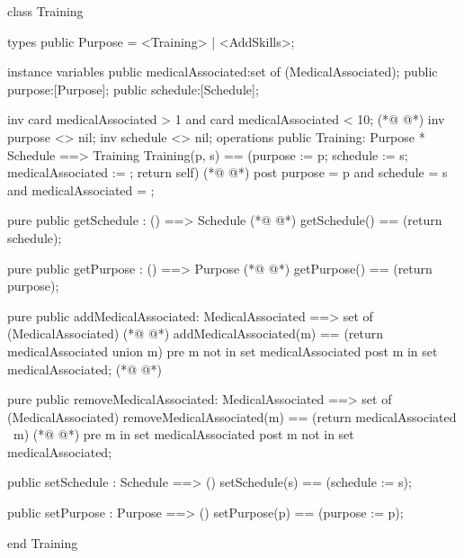 \begin{vdmpp}[breaklines=true]
class Training

types 
 public Purpose = <Training> | <AddSkills>;
 
instance variables
  public medicalAssociated:set of (MedicalAssociated);
  public purpose:[Purpose];
  public schedule:[Schedule];
  
  inv card medicalAssociated > 1 and card medicalAssociated < 10;
(*@
\label{Training:12}
@*)
  inv purpose <> nil;
  inv schedule <> nil;
operations
 public Training: Purpose * Schedule ==> Training
  Training(p, s) == (purpose := p; schedule := s; medicalAssociated := {}; return self)
(*@
\label{getSchedule:17}
@*)
 post purpose = p and schedule = s and medicalAssociated = {};
 
 pure public getSchedule : () ==> Schedule
(*@
\label{getPurpose:20}
@*)
  getSchedule() == (return schedule);
  
 pure public getPurpose : () ==> Purpose
(*@
\label{addMedicalAssociated:23}
@*)
  getPurpose() == (return purpose);
  
 pure public addMedicalAssociated: MedicalAssociated ==> set of (MedicalAssociated)
(*@
\label{removeMedicalAssociated:26}
@*)
  addMedicalAssociated(m) == (return medicalAssociated union {m})
 pre m not in set medicalAssociated
 post m in set medicalAssociated;
(*@
\label{setSchedule:29}
@*)
  
 pure public removeMedicalAssociated: MedicalAssociated ==> set of (MedicalAssociated)
  removeMedicalAssociated(m) == (return medicalAssociated \ {m})
(*@
\label{setPurpose:32}
@*)
 pre m in set medicalAssociated
 post m not in set medicalAssociated;
  
 public setSchedule : Schedule ==> ()
  setSchedule(s) == (schedule := s);
 
 public setPurpose : Purpose ==> ()
  setPurpose(p) == (purpose := p);

end Training
\end{vdmpp}
